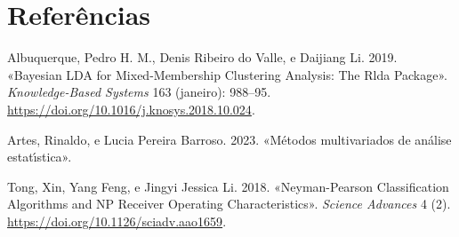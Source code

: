 \documentclass[
  a4paperpaper,
]{article}
\newlength{\cslhangindent}
\newenvironment{CSLReferences}[2] %
 {\begin{list}{}{%
  \setlength{\itemindent}{0pt}
  \setlength{\leftmargin}{0pt}
  \setlength{\parsep}{0pt}
  \ifodd #1
   \setlength{\leftmargin}{\cslhangindent}
   \setlength{\itemindent}{-1\cslhangindent}
  \fi
  \setlength{\itemsep}{#2\baselineskip}}}
 {\end{list}}
\begin{document}
\section*{Referências}\label{referuxeancias}

\label{refs}
\begin{CSLReferences}{1}{0}
Albuquerque, Pedro H. M., Denis Ribeiro do Valle, e Daijiang Li. 2019.
{«Bayesian LDA for Mixed-Membership Clustering Analysis: The Rlda
Package»}. \emph{Knowledge-Based Systems} 163 (janeiro): 988--95.
\url{https://doi.org/10.1016/j.knosys.2018.10.024}.

Artes, Rinaldo, e Lucia Pereira Barroso. 2023. {«M{é}todos multivariados
de an{á}lise estat{ı́}stica»}.

Tong, Xin, Yang Feng, e Jingyi Jessica Li. 2018. {«Neyman-Pearson
Classification Algorithms and NP Receiver Operating Characteristics»}.
\emph{Science Advances} 4 (2).
\url{https://doi.org/10.1126/sciadv.aao1659}.

\end{CSLReferences}
\end{document}
